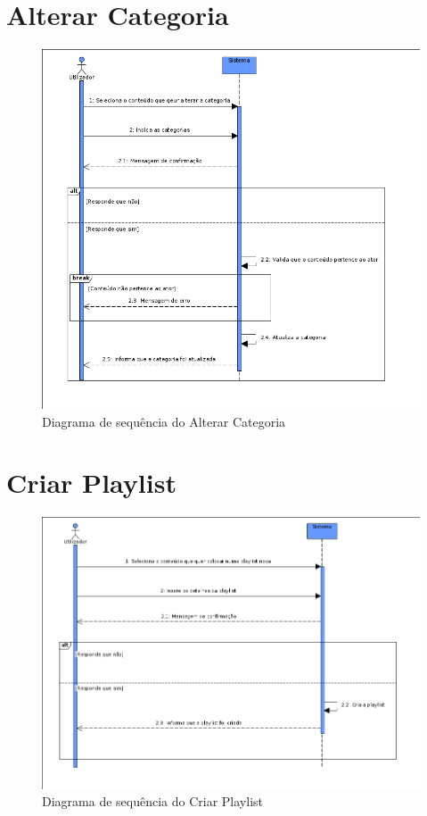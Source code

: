 \documentclass[a4paper]{report}
\begin{document}
\section{Alterar Categoria}

\begin{figure}[H]
	\centering 
    \includegraphics[width=\textwidth]{images/altcategoriaSeq.png}  
    \caption{Diagrama de sequência do Alterar Categoria}
\end{figure}

\section{Criar Playlist}

\begin{figure}[H]
	\centering 
    \includegraphics[width=\textwidth]{images/criarplaylistSeq.png}  
    \caption{Diagrama de sequência do Criar Playlist}
\end{figure}
\end{document}
